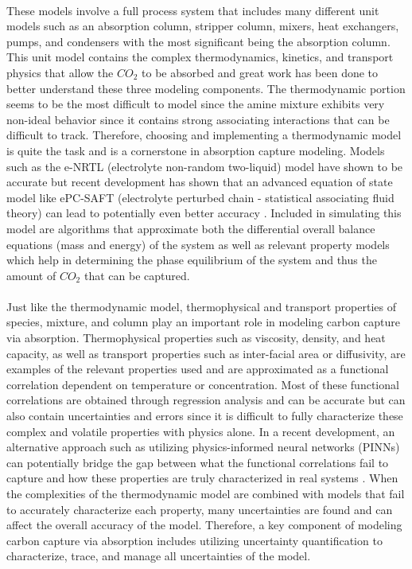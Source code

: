 \documentclass[12pt, letterpaper]{article}
\begin{document}
\paragraph{}
These models involve a full process system that includes many different unit models such as an absorption column, stripper column, mixers, heat exchangers, pumps, and condensers with the most significant being the absorption column.  This unit model contains the complex thermodynamics, kinetics, and transport physics that allow the $CO_2$ to be absorbed and great work has been done to better understand these three modeling components. The thermodynamic portion seems to be the most difficult to model since the amine mixture exhibits very non-ideal behavior since it contains strong associating interactions that can be difficult to track. Therefore, choosing and implementing a thermodynamic model is quite the task and is a cornerstone in absorption capture modeling. Models such as the e-NRTL (electrolyte non-random two-liquid) model have shown to be accurate \cite{Zhang2011} but recent development has shown that an advanced equation of state model like ePC-SAFT (electrolyte perturbed chain - statistical associating fluid theory) can lead to potentially even better accuracy \cite{Held2014}. Included in simulating this model are algorithms that approximate both the differential overall balance equations (mass and energy) of the system as well as relevant property models which help in determining the phase equilibrium of the system and thus the amount of $CO_2$ that can be captured. 

\paragraph{}
Just like the thermodynamic model, thermophysical and transport properties of species, mixture, and column play an important role in modeling carbon capture via absorption.  Thermophysical properties such as viscosity, density, and heat capacity, as well as transport properties such as inter-facial area or diffusivity, are examples of the relevant properties used and are approximated as a functional correlation dependent on temperature or concentration. Most of these functional correlations are obtained through regression analysis \cite{Morgan2017} and can be accurate but can also contain uncertainties and errors since it is difficult to fully characterize these complex and volatile properties with physics alone. In a recent development, an alternative approach such as utilizing physics-informed neural networks (PINNs) can potentially bridge the gap between what the functional correlations fail to capture and how these properties are truly characterized in real systems \cite{Morgan2017}. When the complexities of the thermodynamic model are combined with models that fail to accurately characterize each property, many uncertainties are found and can affect the overall accuracy of the model. Therefore, a key component of modeling carbon capture via absorption includes utilizing uncertainty quantification to characterize, trace, and manage all uncertainties of the model.
\end{document}
